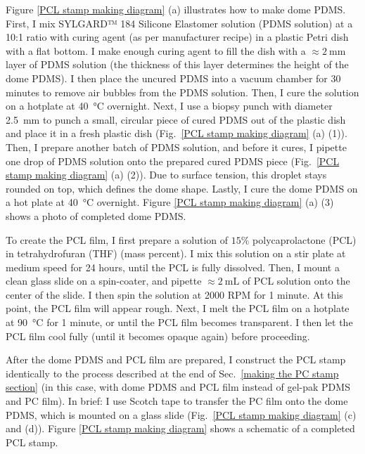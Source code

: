 \documentclass{beavtex_dub_edit}
\begin{document}
Figure \ref{PCL stamp making diagram} (a) illustrates how to make dome PDMS. First, I mix SYLGARD™ 184 Silicone Elastomer solution (PDMS solution) at a 10:1 ratio with curing agent (as per manufacturer recipe) in a plastic Petri dish with a flat bottom. I make enough curing agent to fill the dish with a $\approx \SI{2}{\milli\meter}$ layer of PDMS solution (the thickness of this layer determines the height of the dome PDMS). I then place the uncured PDMS into a vacuum chamber for 30 minutes to remove air bubbles from the PDMS solution. Then, I cure the solution on a hotplate at \SI{40}{\celsius} overnight. Next, I use a biopsy punch with diameter \SI{2.5}{\milli\meter} to punch a small, circular piece of cured PDMS out of the plastic dish and place it in a fresh plastic dish (Fig.\ \ref{PCL stamp making diagram} (a) (1)). Then, I prepare another batch of PDMS solution, and before it cures, I pipette one drop of PDMS solution onto the prepared cured PDMS piece (Fig.\ \ref{PCL stamp making diagram} (a) (2)). Due to surface tension, this droplet stays rounded on top, which defines the dome shape. Lastly, I cure the dome PDMS on a hot plate at \SI{40}{\celsius} overnight. Figure \ref{PCL stamp making diagram} (a) (3) shows a photo of completed dome PDMS.

To create the PCL film, I first prepare a solution of $15 \%$ polycaprolactone (PCL) in tetrahydrofuran (THF) (mass percent). I mix this solution on a stir plate at medium speed for 24  hours, until the PCL is fully dissolved. Then, I mount a clean glass slide on a spin-coater, and pipette $\approx \SI{2}{\milli\liter}$ of PCL solution onto the center of the slide. I then spin the solution at 2000 RPM for 1 minute. At this point, the PCL film will appear rough. Next, I melt the PCL film on a hotplate at \SI{90}{\celsius} for 1 minute, or until the PCL film becomes transparent. I then let the PCL film cool fully (until it becomes opaque again) before proceeding.

After the dome PDMS and PCL film are prepared, I construct the PCL stamp identically to the process described at the end of Sec.\ \ref{making the PC stamp section} (in this case, with dome PDMS and PCL film instead of gel-pak PDMS and PC film). In brief: I use Scotch tape to transfer the PC film onto the dome PDMS, which is mounted on a glass slide (Fig.\ \ref{PCL stamp making diagram} (c) and (d)). Figure \ref{PCL stamp making diagram} shows a schematic of a completed PCL stamp.
\end{document}
